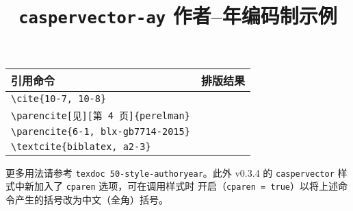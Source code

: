 \documentclass[UTF8]{ctexart}
\begin{document}
\title{\textbf{\texttt{caspervector-ay} 作者--年编码制示例}}
\author{}
\date{}
\maketitle
\vspace*{-1em}

\begin{center}
\begin{tabular}{ll}\hline
引用命令 &	排版结果 \\\hline
\verb|\cite{10-7, 10-8}| &	\cite{10-7, 10-8} \\
\verb|\parencite[见][第 4 页]{perelman}| &	\parencite[见][第 4 页]{perelman} \\
\verb|\parencite{6-1, blx-gb7714-2015}| &	\parencite{6-1, blx-gb7714-2015} \\
\verb|\textcite{biblatex, a2-3}| &	\textcite{biblatex, a2-3} \\\hline
\end{tabular}
\end{center}

更多用法请参考 \verb|texdoc 50-style-authoryear|。此外 v0.3.4 的
\verb|caspervector| 样式中新加入了 \verb|cparen| 选项，可在调用样式时
开启（\verb|cparen = true|）以将上述命令产生的括号改为中文（全角）括号。

\printbibliography[category = cited, title = {本文参考文献}]
\printbibliography[notcategory = cited, title = {%
	其它参考文献示例
	（引自\texorpdfstring{文献 \parencite{gbt7714-2005}}{ GB/T 7714-2005}）%
}]
\nocite{*}
\end{document}
